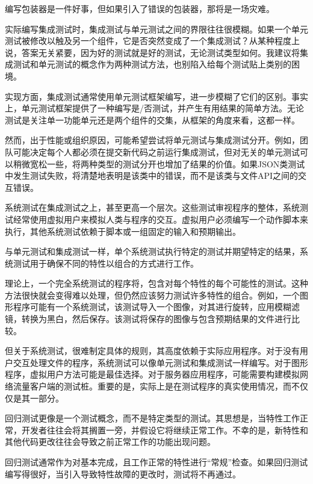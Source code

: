 编写包装器是一件好事，但如果引入了错误的包装器，那将是一场灾难。


实际编写集成测试时，集成测试与单元测试之间的界限往往很模糊。如果一个单元测试被修改以触及另一个组件，它是否突然变成了一个集成测试？从某种程度上说，答案无关紧要，因为好的测试就是好的测试，无论测试类型如何。我建议将集成测试和单元测试的概念作为两种测试方法，也别陷入给每个测试贴上类别的困境。

实现方面，集成测试通常使用单元测试框架编写，进一步模糊了它们的区别。事实上，单元测试框架提供了一种编写是/否测试，并产生有用结果的简单方法。无论测试是关注单一功能单元还是两个组件的交集，从框架的角度来看，这都一样。

然而，出于性能或组织原因，可能希望尝试将单元测试与集成测试分开。例如，团队可能决定每个人都必须在提交新代码之前运行集成测试，但对无关的单元测试可以稍微宽松一些，将两种类型的测试分开也增加了结果的价值。如果JSON类测试中发生测试失败，将清楚地表明是该类中的错误，而不是该类与文件API之间的交互错误。


系统测试在集成测试之上，甚至更高一个层次。这些测试审视程序的整体，系统测试经常使用虚拟用户来模拟人类与程序的交互。虚拟用户必须编写一个动作脚本来执行，其他系统测试依赖于脚本或一组固定的输入和预期输出。

与单元测试和集成测试一样，单个系统测试执行特定的测试并期望特定的结果，系统测试用于确保不同的特性以组合的方式进行工作。

理论上，一个完全系统测试的程序将，包含对每个特性的每个可能性的测试。这种方法很快就会变得难以处理，但仍然应该努力测试许多特性的组合。例如，一个图形程序可能有一个系统测试，该测试导入一个图像，对其进行旋转，应用模糊滤镜，转换为黑白，然后保存。该测试将保存的图像与包含预期结果的文件进行比较。

但关于系统测试，很难制定具体的规则，其高度依赖于实际应用程序。对于没有用户交互处理文件的程序，系统测试可以像单元测试和集成测试一样编写。对于图形程序，虚拟用户方法可能是最佳选择。对于服务器应用程序，可能需要构建模拟网络流量客户端的测试桩。重要的是，实际上是在测试程序的真实使用情况，而不仅仅是其一部分。


回归测试更像是一个测试概念，而不是特定类型的测试。其思想是，当特性工作正常，开发者往往会将其搁置一旁，并假设它将继续正常工作。不幸的是，新特性和其他代码更改往往会导致之前正常工作的功能出现问题。

回归测试通常作为对基本完成，且工作正常的特性进行“常规”检查。如果回归测试编写得很好，当引入导致特性故障的更改时，测试将不再通过。

